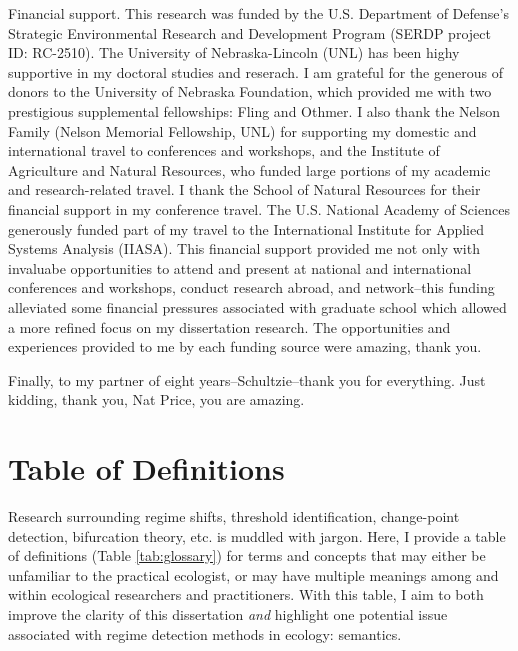 \documentclass[12pt,twoside,openany]{reedthesis}
\begin{document}
Financial support. This research was funded by the U.S. Department of Defense's Strategic Environmental Research and Development Program (SERDP project ID: RC-2510). The University of Nebraska-Lincoln (UNL) has been highy supportive in my doctoral studies and reserach. I am grateful for the generous of donors to the University of Nebraska Foundation, which provided me with two prestigious supplemental fellowships: Fling and Othmer. I also thank the Nelson Family (Nelson Memorial Fellowship, UNL) for supporting my domestic and international travel to conferences and workshops, and the Institute of Agriculture and Natural Resources, who funded large portions of my academic and research-related travel. I thank the School of Natural Resources for their financial support in my conference travel. The U.S. National Academy of Sciences generously funded part of my travel to the International Institute for Applied Systems Analysis (IIASA). This financial support provided me not only with invaluabe opportunities to attend and present at national and international conferences and workshops, conduct research abroad, and network--this funding alleviated some financial pressures associated with graduate school which allowed a more refined focus on my dissertation research. The opportunities and experiences provided to me by each funding source were amazing, thank you.

Finally, to my partner of eight years--Schultzie--thank you for everything. Just kidding, thank you, Nat Price, you are amazing.

\hypertarget{definitions}{%
\chapter*{Table of Definitions}\label{definitions}}

Research surrounding regime shifts, threshold identification, change-point detection, bifurcation theory, etc. is muddled with jargon. Here, I provide a table of definitions (Table \ref{tab:glossary}) for terms and concepts that may either be unfamiliar to the practical ecologist, or may have multiple meanings among and within ecological researchers and practitioners. With this table, I aim to both improve the clarity of this dissertation \emph{and} highlight one potential issue associated with regime detection methods in ecology: semantics.
\end{document}
